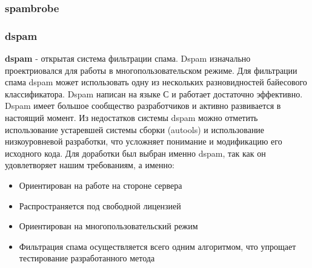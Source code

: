 \subsubsection{spambrobe}


\subsubsection{dspam}
\textbf{dspam} - открытая система фильтрации спама. Dspam изначально проектриовался для работы в многопользовательском режиме.
Для фильтрации спама dspam может использовать одну из нескольких разновидностей байесового классификатора.
Dspam написан на языке С и работает достаточно эффективно. Dspam имеет большое сообщество разработчиков и активно развивается в настоящий момент.
Из недостатков системы dspam можно отметить использование устаревшей системы сборки (autools) и использование низкоуровневой разработки, что усложняет понимание и модификацию его исходного кода.
Для доработки был выбран именно dspam, так как он удовлетворяет нашим требованиям, а именно:
\begin{itemize}
\item Ориентирован на работе на стороне сервера
\item Распространяется под свободной лицензией
\item Ориентирован на многопользовательский режим
\item Фильтрация спама осуществляется  всего одним алгоритмом, что упрощает тестирование разработанного метода
\end{itemize}
